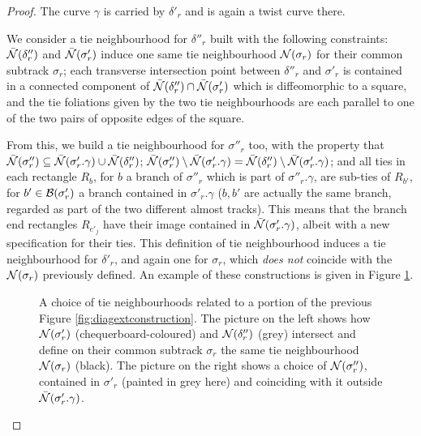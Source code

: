 \begin{proof}
The curve $\gamma$ is carried by $\delta'_r$ and is again a twist curve there.

We consider a tie neighbourhood for $\delta''_r$ built with the following constraints: $\bar{{\mathcal N}}(\delta''_r)$ and $\bar{{\mathcal N}}(\sigma'_r)$ induce one same tie neighbourhood ${\mathcal N}(\sigma_r)$ for their common subtrack $\sigma_r$; each transverse intersection point between $\delta''_r$ and $\sigma'_r$ is contained in a connected component of $\bar{{\mathcal N}}(\delta''_r)\cap\bar{{\mathcal N}}(\sigma'_r)$ which is diffeomorphic to a square, and the tie foliations given by the two tie neighbourhoods are each parallel to one of the two pairs of opposite edges of the square.

From this, we build a tie neighbourhood for $\sigma''_r$ too, with the property that $\bar{{\mathcal N}}(\sigma''_r)\subseteq \bar{{\mathcal N}}(\sigma'_r.\gamma)\cup \bar{{\mathcal N}}(\delta''_r)$; $\bar{{\mathcal N}}(\sigma''_r)\setminus \bar{{\mathcal N}}(\sigma'_r.\gamma)= \bar{{\mathcal N}}(\delta''_r)\setminus \bar{{\mathcal N}}(\sigma'_r.\gamma)$; and all ties in each rectangle $R_b$, for $b$ a branch of $\sigma''_r$ which is part of $\sigma''_r.\gamma$, are sub-ties of $R_{b'}$, for $b'\in\mathcal B(\sigma'_r)$ a branch contained in $\sigma'_r.\gamma$ ($b,b'$ are actually the same branch, regarded as part of the two different almost tracks). This means that the branch end rectangles $R_{e'_j}$ have their image contained in $\bar{{\mathcal N}}(\sigma'_r.\gamma)$, albeit with a new specification for their ties. This definition of tie neighbourhood induces a tie neighbourhood for $\delta'_r$, and again one for $\sigma_r$, which \emph{does not} coincide with the ${\mathcal N}(\sigma_r)$ previously defined. An example of these constructions is given in Figure \ref{fig:diagonalnbhs}.

\begin{figure}
\caption{\label{fig:diagonalnbhs}A choice of tie neighbourhoods related to a portion of the previous Figure \ref{fig:diagextconstruction}. The picture on the left shows how ${\mathcal N}(\sigma'_r)$ (chequerboard-coloured) and ${\mathcal N}(\delta''_r)$ (grey) intersect and define on their common subtrack $\sigma_r$ the same tie neighbourhood ${\mathcal N}(\sigma_r)$ (black). The picture on the right shows a choice of ${\mathcal N}(\sigma''_r)$, contained in $\sigma'_r$ (painted in grey here) and coinciding with it outside $\bar{{\mathcal N}}(\sigma'_r.\gamma)$.}
\end{figure}


\end{proof}
